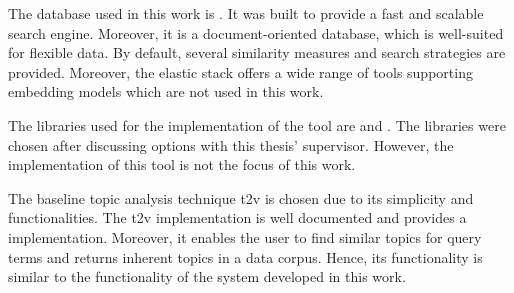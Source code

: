 The database used in this work is \databaseName{}.
It was built to provide a fast and scalable search engine.
Moreover, it is a document-oriented database, which is well-suited for flexible data.
By default, several similarity measures and search strategies are provided.
Moreover, the elastic stack offers a wide range of tools supporting embedding models which are not used in this work.


The libraries used for the implementation of the tool are \angular{} and \flask{}.
The libraries were chosen after discussing options with this thesis' supervisor.
However, the implementation of this tool is not the focus of this work.

The baseline topic analysis technique \ac{t2v} is chosen due to its simplicity and functionalities.
The \ac{t2v} implementation is well documented and provides a \wordcloud{} implementation.
Moreover, it enables the user to find similar topics for query terms and returns inherent topics in a data corpus.
Hence, its functionality is similar to the functionality of the system developed in this work.